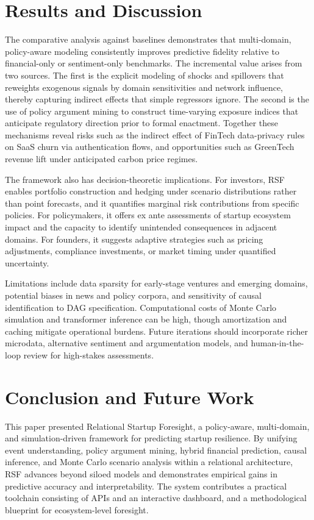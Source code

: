 \documentclass[conference]{IEEEtran}
\begin{document}
\section{Results and Discussion}
The comparative analysis against baselines demonstrates that multi-domain, policy-aware modeling consistently improves predictive fidelity relative to financial-only or sentiment-only benchmarks. The incremental value arises from two sources. The first is the explicit modeling of shocks and spillovers that reweights exogenous signals by domain sensitivities and network influence, thereby capturing indirect effects that simple regressors ignore. The second is the use of policy argument mining to construct time-varying exposure indices that anticipate regulatory direction prior to formal enactment. Together these mechanisms reveal risks such as the indirect effect of FinTech data-privacy rules on SaaS churn via authentication flows, and opportunities such as GreenTech revenue lift under anticipated carbon price regimes.

The framework also has decision-theoretic implications. For investors, RSF enables portfolio construction and hedging under scenario distributions rather than point forecasts, and it quantifies marginal risk contributions from specific policies. For policymakers, it offers ex ante assessments of startup ecosystem impact and the capacity to identify unintended consequences in adjacent domains. For founders, it suggests adaptive strategies such as pricing adjustments, compliance investments, or market timing under quantified uncertainty.

Limitations include data sparsity for early-stage ventures and emerging domains, potential biases in news and policy corpora, and sensitivity of causal identification to DAG specification. Computational costs of Monte Carlo simulation and transformer inference can be high, though amortization and caching mitigate operational burdens. Future iterations should incorporate richer microdata, alternative sentiment and argumentation models, and human-in-the-loop review for high-stakes assessments.

\section{Conclusion and Future Work}
This paper presented Relational Startup Foresight, a policy-aware, multi-domain, and simulation-driven framework for predicting startup resilience. By unifying event understanding, policy argument mining, hybrid financial prediction, causal inference, and Monte Carlo scenario analysis within a relational architecture, RSF advances beyond siloed models and demonstrates empirical gains in predictive accuracy and interpretability. The system contributes a practical toolchain consisting of APIs and an interactive dashboard, and a methodological blueprint for ecosystem-level foresight.
\end{document}
